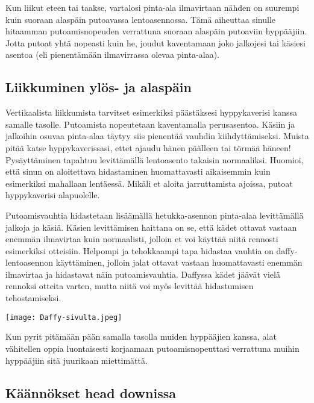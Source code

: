 Kun liikut eteen tai taakse, vartalosi pinta-ala ilmavirtaan nähden on suurempi kuin suoraan alaspäin putoavassa lentoasennossa. Tämä aiheuttaa sinulle hitaamman putoamisnopeuden verrattuna suoraan alaspäin putoaviin hyppääjiin. Jotta putoat yhtä nopeasti kuin he, joudut kaventamaan joko jalkojesi tai käsiesi asentoa (eli pienentämään ilmavirrassa olevaa pinta-alaa). 

\subsection{ Liikkuminen ylös- ja alaspäin }
\label{freefly-lentoasennot-liikkuminen-ylos-ja-alaspain}


Vertikaalista liikkumista tarvitset esimerkiksi päästäksesi hyppykaverisi kanssa samalle tasolle. Putoamista nopeutetaan kaventamalla perusasentoa. Käsiin ja jalkoihin osuvaa pinta-alaa täytyy siis pienentää vauhdin kiihdyttämiseksi. Muista pitää katse hyppykaverissasi, ettet ajaudu hänen päälleen tai törmää häneen! Pysäyttäminen tapahtuu levittämällä lentoasento takaisin normaaliksi. Huomioi, että sinun on aloitettava hidastaminen huomattavasti aikaisemmin kuin esimerkiksi mahallaan lentäessä. Mikäli et aloita jarruttamista ajoissa, putoat hyppykaverisi alapuolelle. 


Putoamisvauhtia hidastetaan lisäämällä hetukka-asennon pinta-alaa levittämällä jalkoja ja käsiä. Käsien levittämisen haittana on se, että kädet ottavat vastaan enemmän ilmavirtaa kuin normaalisti, jolloin et voi käyttää niitä rennosti esimerkiksi otteisiin. Helpompi ja tehokkaampi tapa hidastaa vauhtia on daffy-lentoasennon käyttäminen, jolloin jalat ottavat vastaan huomattavasti enemmän ilmavirtaa ja hidastavat näin putoamisvauhtia. Daffyssa kädet jäävät vielä rennoksi otteita varten, mutta niitä voi myös levittää hidastumisen tehostamiseksi. 


\begin{Figure}\centering\texttt{[image: Daffy-sivulta.jpeg]}\end{Figure} 


Kun pyrit pitämään pään samalla tasolla muiden hyppääjien kanssa, alat vähitellen oppia luontaisesti korjaamaan putoamisnopeuttasi verrattuna muihin hyppääjiin sitä juurikaan miettimättä. 

\subsection{ Käännökset head downissa }
\label{freefly-lentoasennot-kaannokset-head-downissa}


